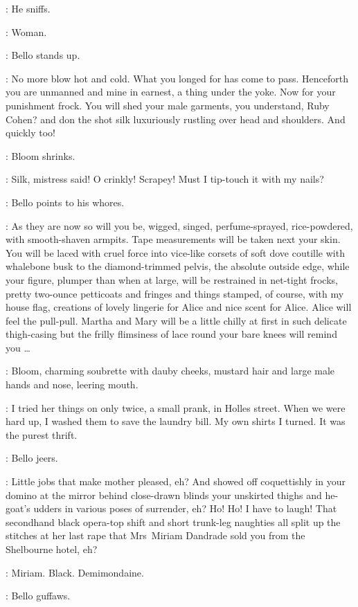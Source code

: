 :
He sniffs.

\Bloom:
Woman.

:
Bello stands up.

\Bello:
No more blow hot and cold.
What you longed for has come to pass.
Henceforth you are unmanned and mine in earnest, a thing under the yoke.
Now for your punishment frock.
You will shed your male garments, you understand, Ruby Cohen?
and don the shot silk luxuriously rustling over head and shoulders.
And quickly too!

:
Bloom shrinks.

\Bloom:
Silk, mistress said!
O crinkly!
Scrapey!
Must I tip-touch it with my nails?

:
Bello points to his whores.

\Bello:
As they are now so will you be, wigged,
singed, perfume-sprayed, rice-powdered, with smooth-shaven armpits.
Tape measurements will be taken next your skin.
You will be laced with cruel force into vice-like corsets
of soft dove coutille with whalebone busk to the diamond-trimmed pelvis,
the absolute outside edge, while your figure,
plumper than when at large, will be restrained in net-tight frocks,
pretty two-ounce petticoats and fringes and things stamped,
of course, with my house flag,
creations of lovely lingerie for Alice and nice scent for Alice.
Alice will feel the pull-pull.
Martha and Mary will be a little chilly at first
in such delicate thigh-casing but the frilly flimsiness of lace
round your bare knees will remind you \ldots

:
Bloom, charming soubrette with dauby cheeks, mustard hair
and large male hands and nose, leering mouth.

\Bloom:
I tried her things on only twice, a small prank, in Holles street.
When we were hard up, I washed them to save the laundry bill.
My own shirts I turned.
It was the purest thrift.

:
Bello jeers.

\Bello:
Little jobs that make mother pleased, eh?
And showed off coquettishly in your domino at the mirror
behind close-drawn blinds your unskirted thighs and he-goat's udders
in various poses of surrender, eh?
Ho! Ho!
I have to laugh!
That secondhand black opera-top shift and short trunk-leg naughties
all split up the stitches at her last rape
that Mrs~Miriam Dandrade sold you from the Shelbourne hotel, eh?

\Bloom:
Miriam.
Black.
Demimondaine.

:
Bello guffaws.

